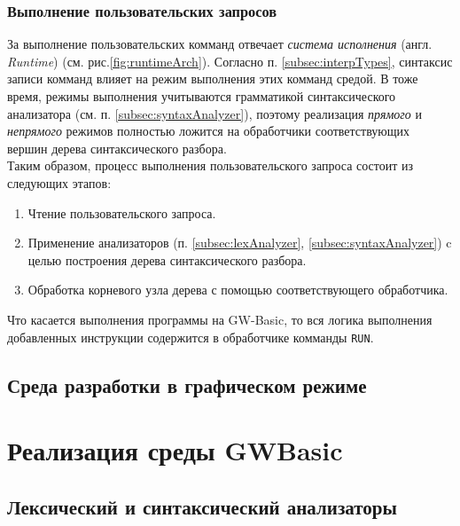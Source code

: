 \documentclass[12pt]{article}
\begin{document}
			\subsubsection{Выполнение пользовательских запросов}
			\hspace{\parindent} За выполнение пользовательских комманд отвечает {\it система исполнения} (англ. {\it Runtime}) (см. рис.\ref{fig:runtimeArch}). Согласно п. \ref{subsec:interpTypes}, синтаксис записи комманд влияет на режим выполнения этих комманд средой. В тоже время, режимы выполнения учитываются грамматикой синтаксического анализатора (см. п. \ref{subsec:syntaxAnalyzer}), поэтому реализация {\it прямого} и {\it непрямого} режимов полностью ложится на обработчики соответствующих вершин дерева синтаксического разбора. \\   
			\indent Таким образом, процесс выполнения пользовательского запроса состоит из следующих этапов:
			\begin{enumerate}
				\item Чтение пользовательского запроса.
				\item Применение анализаторов (п. \ref{subsec:lexAnalyzer}, \ref{subsec:syntaxAnalyzer}) c целью построения дерева синтаксического разбора.
				\item Обработка корневого узла дерева с помощью соответствующего обработчика.
			\end{enumerate}
			
			\indent Что касается выполнения программы на GW-Basic, то вся логика выполнения добавленных инструкции содержится в обработчике комманды {\tt RUN}.
			\subsection{Среда разработки в графическом режиме}
	\newpage
	\section{Реализация среды GWBasic}
		\subsection{Лексический и синтаксический анализаторы}
\end{document}
